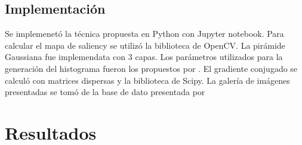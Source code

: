 \documentclass[letterpaper, 10 pt, conference]{ieeeconf}  %
\begin{document}
\subsection{Implementación}
Se implemenetó la técnica propuesta en Python con Jupyter notebook. Para calcular el mapa de saliency se utilizó la biblioteca de OpenCV. La pirámide Gaussiana fue implemendata con 3 capas. Los parámetros utilizados para la generación del histograma fueron los propuestos por \cite{lu}. El gradiente conjugado se calculó con matrices dispersas y la biblioteca de Scipy. La galería de imágenes presentadas se tomó de la base de dato presentada por \cite{lu}


\section{Resultados}
\end{document}
